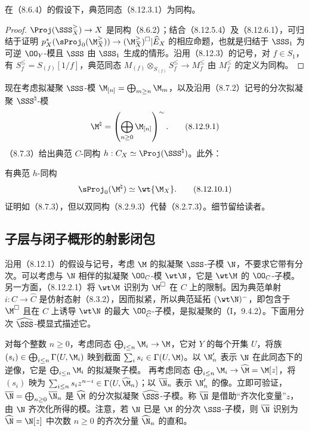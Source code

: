  在（8.6.4）的假设下，典范同态（8.12.3.1）为同构。
\begin{proof}
$\Proj(\SSS_X^{\geq})\to X$ 是同构（8.6.2）；结合（8.12.5.4）及（8.12.6.1），可归结于证明 $p_X^*(\sProj_0(\M_X^{\geq}))\to(\M_X^{\geq})^\square|\widehat E_X$ 的相应命题，也就是归结于 $\SSS_1$ 为可逆 $\OO_Y$-模且 $\SSS$ 由 $\SSS_1$ 生成的情形。沿用（8.12.3）的记号，对 $f\in S_1$，有 $S_f^{\leq}=S_{(f)}[1/f]$，典范同态 $M_{(f)}\otimes_{S_{(f)}}S_f^{\leq}\to M_f^{\leq}$ 由 $M_f^{\leq}$ 的定义为同构。
\end{proof}

 现在考虑拟凝聚 $\SSS$-模 $\M_{[n]}=\bigoplus_{m\geq n}\M_m$，以及沿用（8.7.2）记号的分次拟凝聚 $\SSS^{\natural}$-模
\begin{equation}\M^{\natural}=\left(\bigoplus_{n\geq0}\M_{[n]}\right)^{\sim}.\tag{8.12.9.1}\end{equation}
（8.7.3）给出典范 $C$-同构 $h:C_X\simeq\Proj(\SSS^{\natural})$。此外：

 有典范 $h$-同构
\begin{equation}\sProj_0(\M^{\natural})\simeq\wt{\M_X}.\tag{8.12.10.1}\end{equation}
证明如（8.7.3），但以双同构（8.2.9.3）代替（8.2.7.3）。细节留给读者。

\subsection{子层与闭子概形的射影闭包}

 沿用（8.12.1）的假设与记号，考虑 $\M$ 的拟凝聚 $\SSS$-子模 $\N$，不要求它带有分次。可以考虑与 $\N$ 相伴的拟凝聚 $\OO_C$-模 $\wt\N$，它是 $\wt\M$ 的 $\OO_C$-子模。另一方面，（8.12.2.1）将 $\wt\M$ 识别为 $\M^\square$ 在 $C$ 上的限制。因为典范单射 $i:C\to\widehat C$ 是仿射态射（8.3.2），因而拟紧，所以典范延拓 $(\wt\N)^-$，即包含于 $\M^\square$ 且在 $C$ 上诱导 $\wt\N$ 的最大 $\OO_{\widehat C}$-子模，是拟凝聚的（I，9.4.2）。下面用分次 $\widehat\SSS$-模显式描述它。

 对每个整数 $n\geq0$，考虑同态 $\bigoplus_{i\leq n}\M_i\to\M$，它对 $Y$ 的每个开集 $U$，将族 $(s_i)\in\bigoplus_{i\leq n}\Gamma(U,\M_i)$ 映到截面 $\sum_i s_i\in\Gamma(U,\M)$。以 $\N'_n$ 表示 $\N$ 在此同态下的逆像，它是 $\bigoplus_{i\leq n}\M_i$ 的拟凝聚子模。
再考虑同态 $\bigoplus_{i\leq n}\M_i\to\widehat\M=\M[z]$，将 $(s_i)$ 映为 $\sum_{i\leq n}s_i z^{n-i}\in\Gamma(U,\widehat\M_n)$；以 $\overline\N_n$ 表示 $\N'_n$ 的像。立即可验证，$\overline\N=\bigoplus_{n\geq0}\overline\N_n$ 是 $\widehat\M$ 的分次拟凝聚 $\widehat\SSS$-子模。称 $\overline\N$ 是借助“齐次化变量”$z$，由 $\N$ 齐次化所得的模。注意，若 $\N$ 已是 $\M$ 的分次 $\SSS$-子模，则 $\overline\N$ 识别为 $\widehat\N=\N[z]$ 中次数 $n\geq0$ 的齐次分量 $\widehat\N_n$ 的直和。

